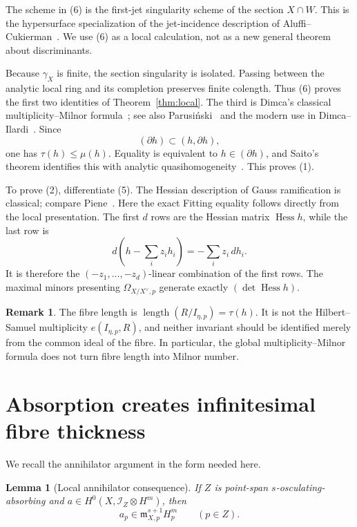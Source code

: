 \documentclass[11pt,a4paper]{article}
\newtheorem{lemma}[theorem]{Lemma}
\theoremstyle{definition}
\newtheorem{remark}[theorem]{Remark}
\newcommand{\cI}{\mathcal I}
\newcommand{\m}{\mathfrak m}
\newcommand{\length}{\operatorname{length}}
\begin{document}
The scheme in (6) is the first-jet singularity scheme of the section
$X\cap W$.  This is the hypersurface specialization of the jet-incidence
description of Aluffi--Cukierman~\cite[\S1, pp.~247--249]{AluffiCukierman1993}.
We use (6) as a local calculation, not as a new general theorem about
discriminants.

Because $\gamma_X$ is finite, the section singularity is isolated.  Passing
between the analytic local ring and its completion preserves finite
colength.  Thus (6) proves the first two identities of
Theorem~\ref{thm:local}.  The third is Dimca's classical
multiplicity--Milnor formula~\cite{Dimca1986}; see also
Parusi\'nski~\cite{Parusinski1991} and the modern use in
Dimca--Ilardi~\cite[(1.3)]{DimcaIlardi2024}.  Since
\[
 (\partial h)\subset(h,\partial h),
\]
one has $\tau(h)\le\mu(h)$.  Equality is equivalent to
$h\in(\partial h)$, and Saito's theorem identifies this with analytic
quasihomogeneity~\cite{Saito1971}.  This proves (1).

To prove (2), differentiate (5).  The Hessian description of Gauss
ramification is classical; compare Piene~\cite{Piene1978}.  Here the exact
Fitting equality follows directly from the local presentation.  The first
$d$ rows are the Hessian matrix
$\operatorname{Hess}h$, while the last row is
\[
 d\!\left(h-\sum_i z_i h_i\right)=-\sum_i z_i\,dh_i.
\]
It is therefore the $(-z_1,\ldots,-z_d)$-linear combination of the first
rows.  The maximal minors presenting $\Omega_{X/X^\vee,p}$ generate exactly
$(\det\operatorname{Hess}h)$.

\begin{remark}
The fibre length is $\length(R/I_{\eta,p})=\tau(h)$.  It is not the
Hilbert--Samuel multiplicity $e(I_{\eta,p},R)$, and neither invariant should
be identified merely from the common ideal of the fibre.  In particular, the
global multiplicity--Milnor formula does not turn fibre length into Milnor
number.
\end{remark}

\section{Absorption creates infinitesimal fibre thickness}

We recall the annihilator argument in the form needed here.

\begin{lemma}[Local annihilator consequence]\label{lem:annihilator}
If $Z$ is point-span $s$-osculating-absorbing and
$a\in H^0(X,\cI_Z\otimes H^m)$, then
\[
 a_p\in\m_{X,p}^{s+1}H_p^m\qquad(p\in Z).
\]
\end{lemma}
\end{document}
